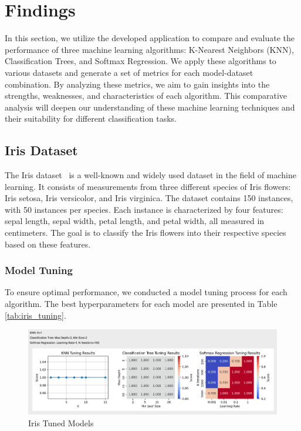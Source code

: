 \documentclass[letterpaper,10pt]{article}
\begin{document}
\newpage

\section{Findings}
In this section, we utilize the developed application to compare and evaluate the performance of three machine learning algorithms: K-Nearest Neighbors (KNN), Classification Trees, and Softmax Regression. We apply these algorithms to various datasets and generate a set of metrics for each model-dataset combination. By analyzing these metrics, we aim to gain insights into the strengths, weaknesses, and characteristics of each algorithm. This comparative analysis will deepen our understanding of these machine learning techniques and their suitability for different classification tasks. \par
\subsection{Iris Dataset}

The Iris dataset~\cite{irisdata} is a well-known and widely used dataset in the field of machine learning. It consists of measurements from three different species of Iris flowers: Iris setosa, Iris versicolor, and Iris virginica. The dataset contains 150 instances, with 50 instances per species. Each instance is characterized by four features: sepal length, sepal width, petal length, and petal width, all measured in centimeters. The goal is to classify the Iris flowers into their respective species based on these features. \par

\subsubsection{Model Tuning}

To ensure optimal performance, we conducted a model tuning process for each algorithm. The best hyperparameters for each model are presented in Table \ref{tab:iris_tuning}.

\begin{figure}[ht]
    \centering
    \includegraphics[width=1.0\textwidth]{iris_tuned.png}
    \caption{Iris Tuned Models}
    \label{iris_tuned}
\end{figure}
\end{document}
